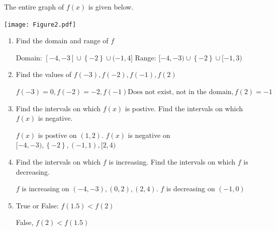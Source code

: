 \documentclass[nooutcomes, noinstructornotes]{ximera}
\begin{document}
\begin{problem}
The entire graph of $f(x)$ is given below.

	\begin{image}
	\texttt{[image: Figure2.pdf]}
	\end{image}

\begin{enumerate}	
	\item  Find the domain and range of $f$
		\begin{freeResponse}
			Domain: $[-4,-3]\cup\left\{-2\right\}\cup(-1,4]$
			Range: $[-4,-3)\cup\left\{-2\right\}\cup[-1,3)$
		\end{freeResponse}	

	\item  Find the values of $f(-3),f(-2), f(-1),f(2)$
		\begin{freeResponse}
		$f(-3)=0, f(-2)=-2, f(-1) \text{Does not exist, not in the domain}, f(2)=-1$
		\end{freeResponse}	

	\item  Find the intervals on which $f(x)$ is postive.  Find the intervals on which $f(x)$ is negative.
		\begin{freeResponse}
		 $f(x)$ is postive on $(1,2)$. $f(x)$ is negative on $[-4,-3),\left\{-2\right\},(-1,1),[2,4)$
		\end{freeResponse}
	
	\item Find the intervals on which $f$ is increasing.  Find the intervals on which $f$ is decreasing.
		\begin{freeResponse}
		$f$ is increasing on $(-4,-3),(0,2),(2,4)$.  $f$ is decreasing on $(-1,0)$
		\end{freeResponse}
	
	\item True or False: $f(1.5) < f(2)$
		\begin{freeResponse}
		False, $f(2) < f(1.5)$
		\end{freeResponse}	
	
	\end{enumerate}

	
\end{problem}

\begin{instructorNotes}

\end{instructorNotes}
\end{document}
